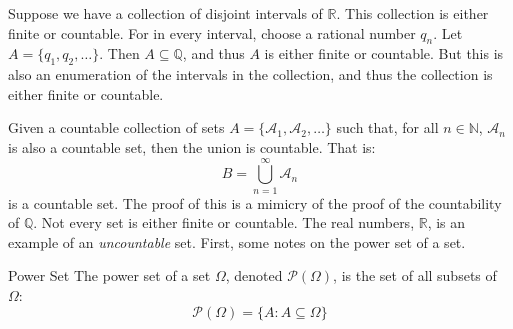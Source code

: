 \documentclass[crop=false,class=book,oneside]{standalone}
\begin{document}
            \begin{lexample}
                Suppose we have a collection of disjoint intervals
                of $\mathbb{R}$. This collection is either finite
                or countable. For in every interval, choose a
                rational number $q_{n}$. Let
                $A=\{q_{1},q_{2},\hdots\}$. Then
                $A\subseteq\mathbb{Q}$, and thus $A$ is either
                finite or countable. But this is also an enumeration
                of the intervals in the collection, and thus the
                collection is either finite or countable.
            \end{lexample}
            Given a countable collection of sets
            $A=\{\mathcal{A}_{1},\mathcal{A}_{2},\hdots\}$ such
            that, for all $n\in\mathbb{N}$, $\mathcal{A}_{n}$ is
            also a countable set, then the union is countable. That is:
            \begin{equation}
                B=\bigcup_{n=1}^{\infty}\mathcal{A}_{n}
            \end{equation}
            is a countable set. The proof of this is a mimicry of
            the proof of the countability of $\mathbb{Q}$. Not
            every set is either finite or countable. The real numbers,
            $\mathbb{R}$, is an example of an \textit{uncountable}
            set. First, some notes on the power set of a set.
            \begin{ldefinition}{Power Set}
                The power set of a set $\Omega$, denoted
                $\mathcal{P}(\Omega)$, is the set of all subsets of
                $\Omega$:
                \begin{equation}
                    \mathcal{P}(\Omega)=
                    \{A:A\subseteq\Omega\}
                \end{equation}
            \end{ldefinition}
\end{document}
